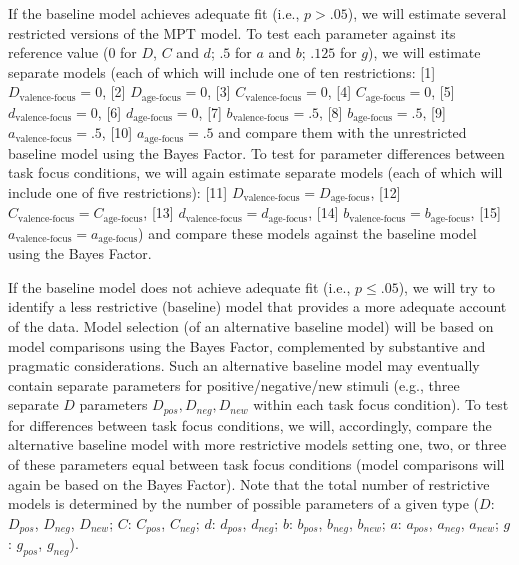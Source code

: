 \documentclass[
  doc,floatsintext]{apa6}
\begin{document}
If the baseline model achieves adequate fit (i.e., \(p > .05\)),
we will estimate several restricted versions of the MPT model.
To test each parameter against its reference value (\(0\) for \(D\), \(C\) and \(d\); \(.5\) for \(a\) and \(b\); \(.125\) for \(g\)),
we will estimate separate models (each of which will include one of ten restrictions:
{[}1{]} \(D_\textrm{valence-focus}=0\),
{[}2{]} \(D_\textrm{age-focus}=0\),
{[}3{]} \(C_\textrm{valence-focus}=0\),
{[}4{]} \(C_\textrm{age-focus}=0\),
{[}5{]} \(d_\textrm{valence-focus}=0\),
{[}6{]} \(d_\textrm{age-focus}=0\),
{[}7{]} \(b_\textrm{valence-focus}=.5\),
{[}8{]} \(b_\textrm{age-focus}=.5\),
{[}9{]} \(a_\textrm{valence-focus}=.5\),
{[}10{]} \(a_\textrm{age-focus}=.5\)
and compare them with the unrestricted baseline model using the Bayes Factor.
To test for parameter differences between task focus conditions,
we will again estimate separate models (each of which will include one of five restrictions):
{[}11{]} \(D_\textrm{valence-focus}=D_\textrm{age-focus}\),
{[}12{]} \(C_\textrm{valence-focus}=C_\textrm{age-focus}\),
{[}13{]} \(d_\textrm{valence-focus}=d_\textrm{age-focus}\),
{[}14{]} \(b_\textrm{valence-focus}=b_\textrm{age-focus}\),
{[}15{]} \(a_\textrm{valence-focus}=a_\textrm{age-focus}\))
and compare these models against the baseline model using the Bayes Factor.

If the baseline model does not achieve adequate fit (i.e., \(p \leq .05\)),
we will try to identify a less restrictive (baseline) model that provides a more adequate account of the data.
Model selection (of an alternative baseline model) will be based on model comparisons using the Bayes Factor,
complemented by substantive and pragmatic considerations.
Such an alternative baseline model may eventually contain separate parameters for positive/negative/new stimuli (e.g., three separate \(D\) parameters \(D_\textit{pos}, D_\textit{neg}, D_\textit{new}\) within each task focus condition).
To test for differences between task focus conditions,
we will, accordingly, compare the alternative baseline model with more restrictive models setting one, two, or three of these parameters equal between task focus conditions (model comparisons will again be based on the Bayes Factor).
Note that the total number of restrictive models is determined by the number of possible parameters of a given type (\(D\): \(D_\textit{pos}\), \(D_\textit{neg}\), \(D_\textit{new}\); \(C\): \(C_\textit{pos}\), \(C_\textit{neg}\); \(d\): \(d_\textit{pos}\), \(d_\textit{neg}\); \(b\): \(b_\textit{pos}\), \(b_\textit{neg}\), \(b_\textit{new}\); \(a\): \(a_\textit{pos}\), \(a_\textit{neg}\), \(a_\textit{new}\); \(g\): \(g_\textit{pos}\), \(g_\textit{neg}\)).
\end{document}
